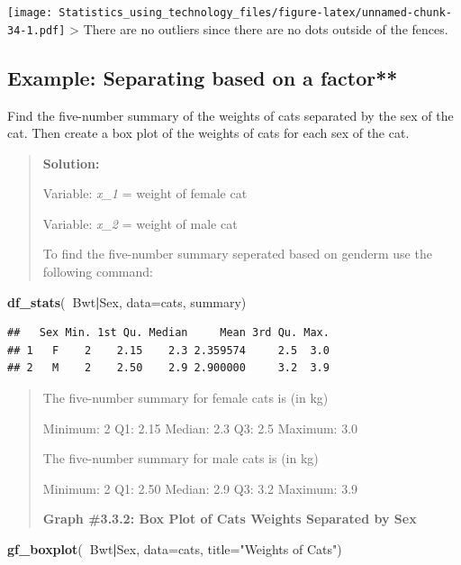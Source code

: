 \documentclass[]{book}
\newenvironment{Shaded}{\begin{snugshade}}{\end{snugshade}}
\newcommand{\DataTypeTok}[1]{\textcolor[rgb]{0.13,0.29,0.53}{#1}}
\newcommand{\KeywordTok}[1]{\textcolor[rgb]{0.13,0.29,0.53}{\textbf{#1}}}
\newcommand{\NormalTok}[1]{#1}
\newcommand{\OperatorTok}[1]{\textcolor[rgb]{0.81,0.36,0.00}{\textbf{#1}}}
\newcommand{\StringTok}[1]{\textcolor[rgb]{0.31,0.60,0.02}{#1}}
\begin{document}
\texttt{[image: Statistics\_using\_technology\_files/figure-latex/unnamed-chunk-34-1.pdf]}
\textgreater{} There are no outliers since there are no dots outside of the fences.

\hypertarget{example-separating-based-on-a-factor}{%
\subsection{Example: Separating based on a factor**}\label{example-separating-based-on-a-factor}}

Find the five-number summary of the weights of cats separated by the sex of the cat. Then create a box plot of the weights of cats for each sex of the cat.

\begin{quote}
\textbf{Solution:}

Variable: \emph{x\_1} = weight of female cat

Variable: \emph{x\_2} = weight of male cat

To find the five-number summary seperated based on genderm use the following command:
\end{quote}

\begin{Shaded}
\begin{Highlighting}[]
\KeywordTok{df_stats}\NormalTok{(}\OperatorTok{~}\NormalTok{Bwt}\OperatorTok{|}\NormalTok{Sex, }\DataTypeTok{data=}\NormalTok{cats, summary)}
\end{Highlighting}
\end{Shaded}

\begin{verbatim}
##   Sex Min. 1st Qu. Median     Mean 3rd Qu. Max.
## 1   F    2    2.15    2.3 2.359574     2.5  3.0
## 2   M    2    2.50    2.9 2.900000     3.2  3.9
\end{verbatim}

\begin{quote}
The five-number summary for female cats is (in kg)

Minimum: 2
Q1: 2.15
Median: 2.3
Q3: 2.5
Maximum: 3.0

The five-number summary for male cats is (in kg)

Minimum: 2
Q1: 2.50
Median: 2.9
Q3: 3.2
Maximum: 3.9

\textbf{Graph \#3.3.2: Box Plot of Cats Weights Separated by Sex}
\end{quote}

\begin{Shaded}
\begin{Highlighting}[]
\KeywordTok{gf_boxplot}\NormalTok{(}\OperatorTok{~}\NormalTok{Bwt}\OperatorTok{|}\NormalTok{Sex, }\DataTypeTok{data=}\NormalTok{cats, }\DataTypeTok{title=}\StringTok{"Weights of Cats"}\NormalTok{)}
\end{Highlighting}
\end{Shaded}
\end{document}
